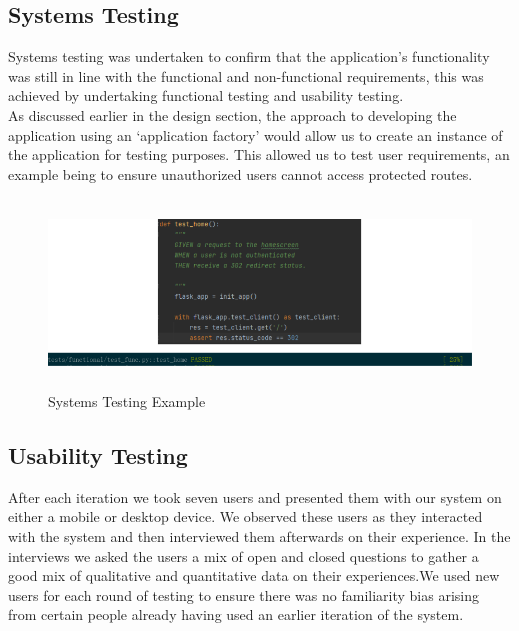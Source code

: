 \documentclass[11pt, english]{article}
\begin{document}
	\subsection{Systems Testing}

	Systems testing was undertaken to confirm that the application's functionality was still in line with the functional and non-functional requirements, this was achieved by undertaking functional testing and usability testing.\\

	As discussed earlier in the design section, the approach to developing the application using an `application factory' would allow us to create an instance of the application for testing purposes. This allowed us to test user requirements, an example being to ensure unauthorized users cannot access protected routes.

	\begin{figure}[H]
	\begin{center}
		\includegraphics[width=14cm,height=5cm]{CS993_IMG/Testing4.png}
		\caption{Systems Testing Example}
	\end{center}
	\end{figure}

	\subsection{Usability Testing}

	After each iteration we took seven users and presented them with our system on either a mobile or desktop device. We observed these users as they interacted with the system and then interviewed them afterwards on their experience. In the interviews we asked the users a mix of open and closed questions to gather a good mix of qualitative and quantitative data on their experiences.We used new users for each round of testing to ensure there was no familiarity bias arising from certain people already having used an earlier iteration of the system.\\
\end{document}
